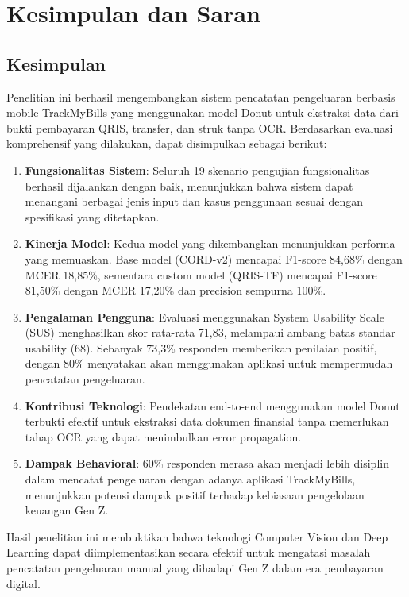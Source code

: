 \section{Kesimpulan dan Saran}

\subsection{Kesimpulan}
Penelitian ini berhasil mengembangkan sistem pencatatan pengeluaran berbasis mobile TrackMyBills yang menggunakan model Donut untuk ekstraksi data dari bukti pembayaran QRIS, transfer, dan struk tanpa OCR. Berdasarkan evaluasi komprehensif yang dilakukan, dapat disimpulkan sebagai berikut:

\begin{enumerate}
    \item \textbf{Fungsionalitas Sistem}: Seluruh 19 skenario pengujian fungsionalitas berhasil dijalankan dengan baik, menunjukkan bahwa sistem dapat menangani berbagai jenis input dan kasus penggunaan sesuai dengan spesifikasi yang ditetapkan.
    
    \item \textbf{Kinerja Model}: Kedua model yang dikembangkan menunjukkan performa yang memuaskan. Base model (CORD-v2) mencapai F1-score 84,68\% dengan MCER 18,85\%, sementara custom model (QRIS-TF) mencapai F1-score 81,50\% dengan MCER 17,20\% dan precision sempurna 100\%.
    
    \item \textbf{Pengalaman Pengguna}: Evaluasi menggunakan System Usability Scale (SUS) menghasilkan skor rata-rata 71,83, melampaui ambang batas standar usability (68). Sebanyak 73,3\% responden memberikan penilaian positif, dengan 80\% menyatakan akan menggunakan aplikasi untuk mempermudah pencatatan pengeluaran.
    
    \item \textbf{Kontribusi Teknologi}: Pendekatan end-to-end menggunakan model Donut terbukti efektif untuk ekstraksi data dokumen finansial tanpa memerlukan tahap OCR yang dapat menimbulkan error propagation.
    
    \item \textbf{Dampak Behavioral}: 60\% responden merasa akan menjadi lebih disiplin dalam mencatat pengeluaran dengan adanya aplikasi TrackMyBills, menunjukkan potensi dampak positif terhadap kebiasaan pengelolaan keuangan Gen Z.
\end{enumerate}

Hasil penelitian ini membuktikan bahwa teknologi Computer Vision dan Deep Learning dapat diimplementasikan secara efektif untuk mengatasi masalah pencatatan pengeluaran manual yang dihadapi Gen Z dalam era pembayaran digital.

